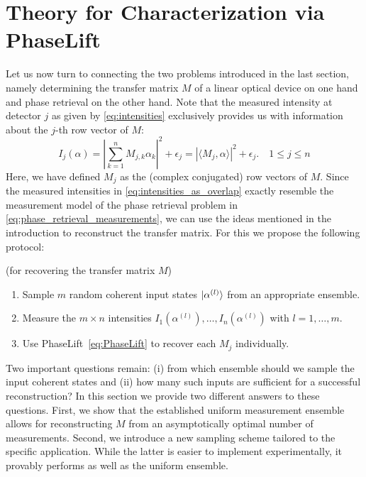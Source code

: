 \section{Theory for Characterization via PhaseLift}

Let us now turn to connecting the two problems introduced in the last section, namely determining the transfer matrix ${M}$ of a linear optical device on one hand and phase retrieval on the other hand.
Note that the measured intensity at detector $j$ as given by \cref{eq:intensities} exclusively provides us with information about the $j$-th row vector of ${M}$:
\[
  I_j({\alpha})
  = \left| \sum_{k=1}^n M_{j,k} \alpha_k \right|^2 + \epsilon_j
  = \left\vert  \langle {M}_j, \alpha \rangle  \right\vert^2 + \epsilon_j. \quad 1 \leq j \leq n
  \label{eq:intensities_as_overlap}
\]
Here, we have defined ${M}_j$ as the (complex conjugated) row vectors of ${M}$.
Since the measured intensities in \cref{eq:intensities_as_overlap} exactly resemble the measurement model of the phase retrieval problem in \cref{eq:phase_retrieval_measurements}, we can use the ideas mentioned in the introduction to reconstruct the transfer matrix.
For this we propose the following protocol:
\begin{protocol}{(for recovering the transfer matrix $ M$)}%
  \label{prot:characterization}
  \begin{enumerate}
    \item Sample $m$ random coherent input states $\ket{ \alpha^{(l)}}$ from an appropriate ensemble.
    \item Measure the $m \times n$ intensities $I_1(\alpha^{(l)}), \ldots, I_n ( \alpha^{(l)})$ with $l=1,\ldots,m$.
    \item Use PhaseLift~\eqref{eq:PhaseLift} to recover each ${M}_j$ individually.
  \end{enumerate}
\end{protocol}
Two important questions remain:
(i) from which ensemble should we sample the input coherent states and (ii) how many such inputs are sufficient for a successful reconstruction?
In this section we provide two different answers to these questions.
First, we show that the established uniform measurement ensemble~\cite{kueng_low_2014} allows for reconstructing $ M$ from an asymptotically optimal number of measurements.
Second, we introduce a new sampling scheme tailored to the specific application.
While the latter is easier to implement experimentally, it provably performs as well as the uniform ensemble.

